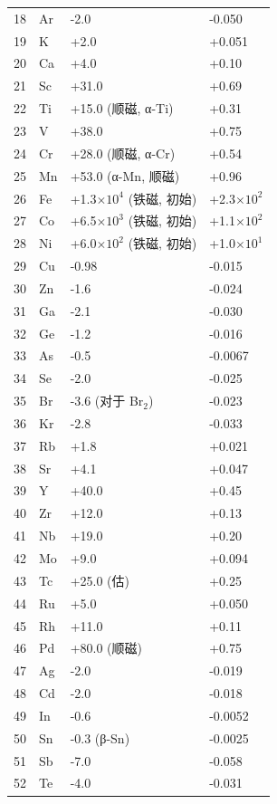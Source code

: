 \documentclass[12pt,a4paper]{article}
\begin{document}
\begin{longtable}{p{0.6cm}p{1.2cm}p{2.5cm}p{2.5cm}}
		18 & Ar & -2.0 & -0.050 \\
		19 & K  & +2.0 & +0.051 \\
		20 & Ca & +4.0 & +0.10 \\
		21 & Sc & +31.0 & +0.69 \\
		22 & Ti & +15.0 (顺磁, α-Ti) & +0.31 \\
		23 & V  & +38.0 & +0.75 \\
		24 & Cr & +28.0 (顺磁, α-Cr) & +0.54 \\
		25 & Mn & +53.0 (α-Mn, 顺磁) & +0.96 \\
		26 & Fe & +1.3\(\times10^4\) (铁磁, 初始) & +2.3\(\times10^2\) \\
		27 & Co & +6.5\(\times10^3\) (铁磁, 初始) & +1.1\(\times10^2\) \\
		28 & Ni & +6.0\(\times10^2\) (铁磁, 初始) & +1.0\(\times10^1\) \\
		29 & Cu & -0.98 & -0.015 \\
		30 & Zn & -1.6 & -0.024 \\
		31 & Ga & -2.1 & -0.030 \\
		32 & Ge & -1.2 & -0.016 \\
		33 & As & -0.5 & -0.0067 \\
		34 & Se & -2.0 & -0.025 \\
		35 & Br & -3.6 (对于 Br\(_2\)) & -0.023 \\
		36 & Kr & -2.8 & -0.033 \\
		37 & Rb & +1.8 & +0.021 \\
		38 & Sr & +4.1 & +0.047 \\
		39 & Y  & +40.0 & +0.45 \\
		40 & Zr & +12.0 & +0.13 \\
		41 & Nb & +19.0 & +0.20 \\
		42 & Mo & +9.0 & +0.094 \\
		43 & Tc & +25.0 (估) & +0.25 \\
		44 & Ru & +5.0 & +0.050 \\
		45 & Rh & +11.0 & +0.11 \\
		46 & Pd & +80.0 (顺磁) & +0.75 \\
		47 & Ag & -2.0 & -0.019 \\
		48 & Cd & -2.0 & -0.018 \\
		49 & In & -0.6 & -0.0052 \\
		50 & Sn & -0.3 (β-Sn) & -0.0025 \\
		51 & Sb & -7.0 & -0.058 \\
		52 & Te & -4.0 & -0.031 \\

\end{longtable}
\end{document}
